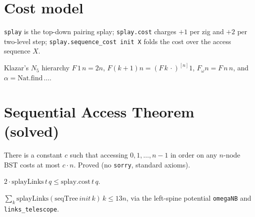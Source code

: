 
\section{Cost model}

\begin{definition}\label{def:splay}\leanok
  \texttt{splay} is the top-down pairing splay; \texttt{splay.cost} charges $+1$ per
  zig and $+2$ per two-level step; \texttt{splay.sequence\_cost init X} folds the
  cost over the access sequence $X$.
\end{definition}

\begin{definition}\label{def:alpha}\leanok
  Klazar's $N_5$ hierarchy $F\,1\,n=2n$, $F(k{+}1)n=(F\,k\,\cdot)^{[n]}1$,
  $F_\omega n = F\,n\,n$, and $\alpha=\mathrm{Nat.find}\,\dots$.
\end{definition}

\section{Sequential Access Theorem (solved)}

\begin{theorem}\label{thm:sequential}\leanok{}
  There is a constant $c$ such that accessing $0,1,\dots,n-1$ in order on any
  $n$-node BST costs at most $c\cdot n$. Proved (no \texttt{sorry}, standard axioms).
\end{theorem}

\begin{lemma}\label{lem:links}\leanok
  $2\cdot\mathrm{splayLinks}\,t\,q \le \mathrm{splay.cost}\,t\,q$.
\end{lemma}

\begin{lemma}\label{lem:totallinks}\leanok{}
  $\sum_k \mathrm{splayLinks}(\mathrm{seqTree}\,init\,k)\,k \le 13n$, via the
  left-spine potential \texttt{omegaNB} and \texttt{links\_telescope}.
\end{lemma}

